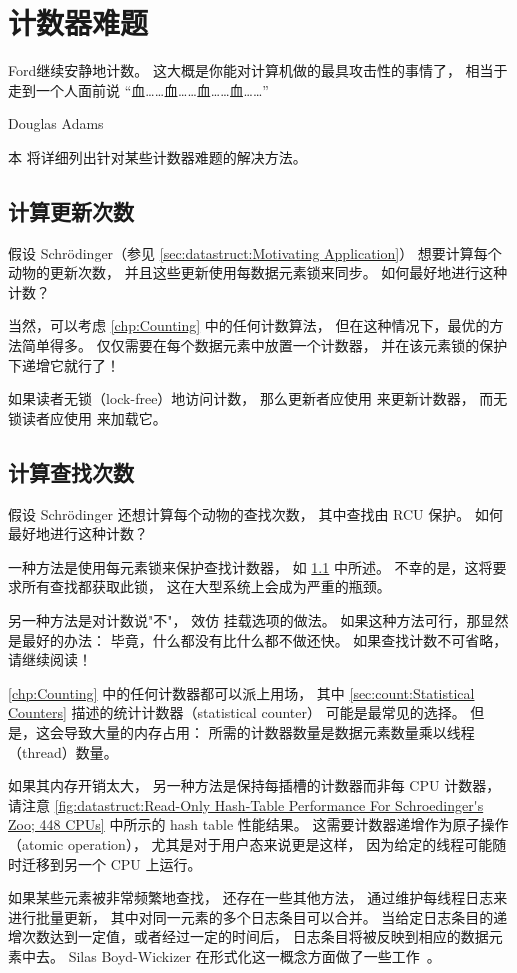 
\section{计数器难题}
\label{sec:together:Counter Conundrums}
%
\epigraph{Ford继续安静地计数。
	  这大概是你能对计算机做的最具攻击性的事情了，
	  相当于走到一个人面前说
	  ``血……血……血……血……''}
	 {Douglas Adams}

本
将详细列出针对某些计数器难题的解决方法。

\subsection{计算更新次数}
\label{sec:together:Counting Updates}

假设 Schr\"odinger（参见
\cref{sec:datastruct:Motivating Application}）
想要计算每个动物的更新次数，
并且这些更新使用每数据元素锁来同步。
如何最好地进行这种计数？

当然，可以考虑 \cref{chp:Counting} 中的任何计数算法，
但在这种情况下，最优的方法简单得多。
仅仅需要在每个数据元素中放置一个计数器，
并在该元素锁的保护下递增它就行了！

如果读者无锁（lock-free）地访问计数，
那么更新者应使用  来更新计数器，
而无锁读者应使用  来加载它。

\subsection{计算查找次数}
\label{sec:together:Counting Lookups}

假设 Schr\"odinger 还想计算每个动物的查找次数，
其中查找由 RCU 保护。
如何最好地进行这种计数？

一种方法是使用每元素锁来保护查找计数器，
如 \cref{sec:together:Counting Updates} 中所述。
不幸的是，这将要求所有查找都获取此锁，
这在大型系统上会成为严重的瓶颈。

另一种方法是对计数说"不"，
效仿  挂载选项的做法。
如果这种方法可行，那显然是最好的办法：
毕竟，什么都没有比什么都不做还快。
如果查找计数不可省略，请继续阅读！

\cref{chp:Counting} 中的任何计数器都可以派上用场，
其中 \cref{sec:count:Statistical Counters} 描述的统计计数器（statistical counter）
可能是最常见的选择。
但是，这会导致大量的内存占用：
所需的计数器数量是数据元素数量乘以线程（thread）数量。

如果其内存开销太大，
另一种方法是保持每插槽的计数器而非每 CPU 计数器，
请注意
\cref{fig:datastruct:Read-Only Hash-Table Performance For Schroedinger's Zoo; 448 CPUs}
中所示的 hash table 性能结果。
这需要计数器递增作为原子操作（atomic operation），
尤其是对于用户态来说更是这样，
因为给定的线程可能随时迁移到另一个 CPU 上运行。

如果某些元素被非常频繁地查找，
还存在一些其他方法，
通过维护每线程日志来进行批量更新，
其中对同一元素的多个日志条目可以合并。
当给定日志条目的递增次数达到一定值，或者经过一定的时间后，
日志条目将被反映到相应的数据元素中去。
Silas Boyd-Wickizer 在形式化这一概念方面做了一些工作~\cite{SilasBoydWickizerPhD}。
